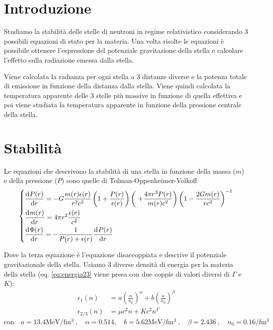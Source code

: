 \documentclass[a4paper, titlepage]{article}
\begin{document}
\tableofcontents

\section{Introduzione}
Studiamo la stabilità delle stelle di neutroni in regime relativistico considerando 3 possibili equazioni di stato per la materia.
Una volta risolte le equazioni è possibile ottenere l'espressione del potenziale gravitazione della stella e calcolare l'effetto sulla radiazione emessa dalla stella.


Viene calcolata la radianza per ogni stella a 3 distanze diverse e la potenza totale di emissione in funzione della distanza dalla stella.
Viene quindi calcolata la temperatura apparente delle 3 stelle più massive in funzione di quella effettiva e poi viene studiata la temperatura apparente in funzione della pressione centrale della stella.

\section{Stabilità}

Le equazioni che descrivono la stabilità di una stella in funzione della massa ($m$) e della pressione ($P$) sono quelle di Tolman-Oppenheimer-Volkoff
\begin{equation}
    \begin{dcases}
        \dv[]{P(r)}{r} = - G \frac{m(r) \epsilon (r)}{r^2 c^2} \left(1 + \frac{P(r)}{\epsilon (r)} \right) \left(\ + \frac{4 \pi r^3 P(r)}{m(r) c^2} \right) \left(1 - \frac{2 G m(r)}{r c^2} \right)^{-1} \\
        \dv[]{m(r)}{r} = 4 \pi r^2 \frac{\epsilon (r)}{c^2} \\
        \dv[]{\Phi(r)}{r} = - \frac{1}{P(r) + \epsilon (r)} \dv[]{P(r)}{r}
    \end{dcases}
    \label{eq:sistema_corr}
\end{equation}

Dove la terza equazione è l'equazione disaccoppiata e descrive il potenziale gravitazionale della stella.
Usiamo 3 diverse densità di energia per la materia della stella (eq. \ref{eq:energia23} viene presa con due coppie di valori diversi di $\Gamma$ e $K$):
\begin{subequations}
\begin{align}
    \epsilon_1 (n) &= a \left( \frac{n}{n_0} \right) ^{\alpha} + b \left( \frac{n}{n_0} \right) ^{\beta} \label{eq:energia1} \\
    \epsilon_{2/3} (n) &= \mu c^2n+Kc^2n^\Gamma \label{eq:energia23}
\end{align}
\end{subequations}
\begin{equation}
    \text{con} \quad a = 13.4 \unit{\mega\electronvolt\per\femto\cubic\meter} \ , \quad
    \alpha = 0.514, \quad
    b = 5.62 \unit{\mega\electronvolt\per\femto\cubic\meter} \ , \quad
    \beta = 2.436 \ , \quad
    n_0 = 0.16 \unit{\per\femto\cubic\meter}
\end{equation}
\end{document}
